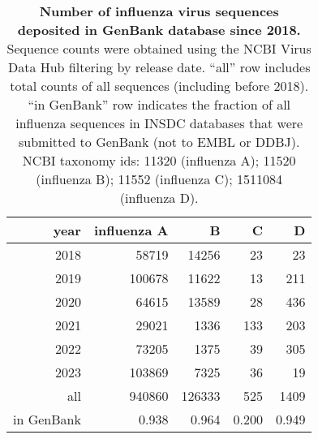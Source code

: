 \begin{table}[t]
\caption{\textbf{Number of influenza virus sequences deposited in GenBank database since 2018.} Sequence counts were obtained using the NCBI Virus Data Hub filtering by release date. ``all'' row includes total counts of all sequences (including before 2018). ``in GenBank'' row indicates the fraction of all influenza sequences in INSDC databases that were submitted to GenBank (not to EMBL or DDBJ). NCBI taxonomy ids: 11320 (influenza A); 11520 (influenza B); 11552 (influenza C); 1511084 (influenza D).}
\begin{tabular}{rrrrr}
year              &influenza A       &B                 &C                 &D                 \\ \hline
              2018&             58719&             14256&                23&                23 \\
              2019&            100678&             11622&                13&               211 \\
              2020&             64615&             13589&                28&               436 \\
              2021&             29021&              1336&               133&               203 \\
              2022&             73205&              1375&                39&               305 \\
              2023&            103869&              7325&                36&                19 \\ \hline
               all&            940860&            126333&               525&              1409 \\
        in GenBank&             0.938&             0.964&             0.200&             0.949 \\
\end{tabular}
\label{tbl:nseqs}
\end{table}
